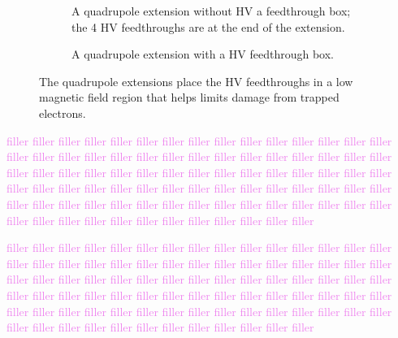 \begin{figure}[]
	\centering
	\begin{subfigure}{\columnwidth}
		\caption{A quadrupole extension without HV a feedthrough box; the 4 HV feedthroughs are at the end of the extension.}\label{fig:extension_no_box}
	\end{subfigure}
	\begin{subfigure}{\columnwidth}
		\caption{A quadrupole extension with a HV feedthrough box.}\label{fig:extension_box}
	\end{subfigure}
	\caption{The quadrupole extensions place the HV feedthroughs in a low magnetic field region that helps limits damage from trapped electrons.}\label{fig:extension}
\end{figure}

\textcolor{violet}{filler filler filler filler filler filler filler filler filler filler filler filler filler filler filler filler filler filler filler filler filler filler filler filler filler filler filler filler filler filler filler filler filler filler filler filler filler filler filler filler filler filler filler filler filler filler filler filler filler filler filler filler filler filler filler filler filler filler filler filler filler filler filler filler filler filler filler filler filler filler filler filler filler filler filler filler filler filler filler filler filler filler filler filler filler filler filler}

\textcolor{violet}{filler filler filler filler filler filler filler filler filler filler filler filler filler filler filler filler filler filler filler filler filler filler filler filler filler filler filler filler filler filler filler filler filler filler filler filler filler filler filler filler filler filler filler filler filler filler filler filler filler filler filler filler filler filler filler filler filler filler filler filler filler filler filler filler filler filler filler filler filler filler filler filler filler filler filler filler filler filler filler filler filler filler filler filler filler filler filler}

